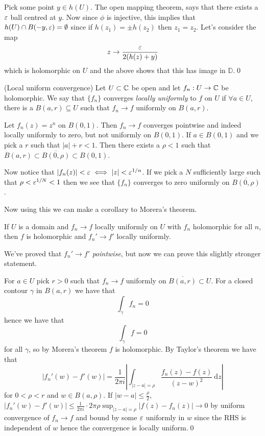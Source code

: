 \documentclass{article}
\begin{document}
Pick some point $ y\in h(U) $. The open mapping theorem, says that there exists a $ \varepsilon $ ball centred at $ y $. Now since $ \phi $ is injective, this implies that $ h(U)\cap B(-y,\varepsilon)=\emptyset $ since if $ h(z_1) =\pm h(z_2) $ then $ z_1=z_2 $. Let's consider the map
\[
	z\to \frac{\varepsilon}{2(h(z) + y)}
\]
which is holomorphic on $ U $ and the above shows that this has image in $ \mathbb D $.\qed
\begin{definition}
	(Local uniform convergence) Let $ U\subset \mathbb{C} $ be open and let $ f_n:U\to \mathbb{C} $ be holomorphic. We say that $ \{f_n\} $ converges \textit{locally uniformly} to $ f $ on $ U $ if $ \forall a\in U $, there is a $ B(a,r)\subseteq U $ such that $ f_n\to f $ uniformly on $ B(a,r) $.
\end{definition}
\begin{example}
	Let $ f_n(z) = z^n $ on $ B(0,1) $. Then $ f_n\to f $ converges pointwise and indeed locally uniformly to zero, but not uniformly on $ B(0,1) $. If $ a\in B(0,1) $ and we pick a $ r $ such that $ |a|+r<1 $. Then there exists a $ \rho<1 $ such that $ B(a,r)\subset \overline{B(0,\rho)}\subset B(0,1) $.\par
	Now notice that $ |f_n(z)| < \varepsilon \iff |z| < \varepsilon^{1/n} $. If we pick a $ N $ sufficiently large such that $ \rho < \varepsilon^{1/N}<1 $ then we see that $ \{f_n\} $ converges to zero uniformly on $ \overline{B(0,\rho)} $.
\end{example}
Now using this we can make a corollary to Morera's theorem.
\begin{corollary}
  If $ U $ is a domain and $ f_n\to f $ locally uniformly on $ U $ with $ f_n $ holomorphic for all $ n $, then $ f $ is holomorphic and $ f_n'\to f' $ locally uniformly.
\end{corollary}
\begin{remark}
	We've proved that $ f_n'\to f' $ \textit{pointwise}, but now we can prove this slightly stronger statement.
\end{remark}
\pf For $ a\in U $ pick $ r>0 $ such that $ f_n\to f $ uniformly on $ \overline{B(a,r)}\subset U $. For a closed contour $ \gamma $ in $ B(a,r) $ we have that 
\[
  \int_\gamma f_n = 0
\]
hence we have that
\[
  \int_\gamma f = 0
\]
for all $ \gamma $, so by Morera's theorem $ f $ is holomorphic. By Taylor's theorem we have that
\[
	|f_n'(w)-f'(w)| = \frac 1{2\pi i} \left|\int_{|z-a|=\rho} \frac{f_n(z)-f(z)}{(z-w)^2} \ \mathrm dz\right|
\]
for $ 0<\rho < r $ and $ w\in B(a,\rho) $. If $ |w-a| \le \frac{\rho}2 $, $ |f_n'(w)-f'(w)| \le \frac 1{2\pi i} \cdot 2\pi \rho \sup_{|z-a|=\rho}|f(z)-f_n(z)|\to 0 $ by uniform convergence of $ f_n\to f $ and bound by some $ \varepsilon $ uniformly in $ w $ since the RHS is independent of $ w $ hence the convergence is locally uniform.\qed
\end{document}
